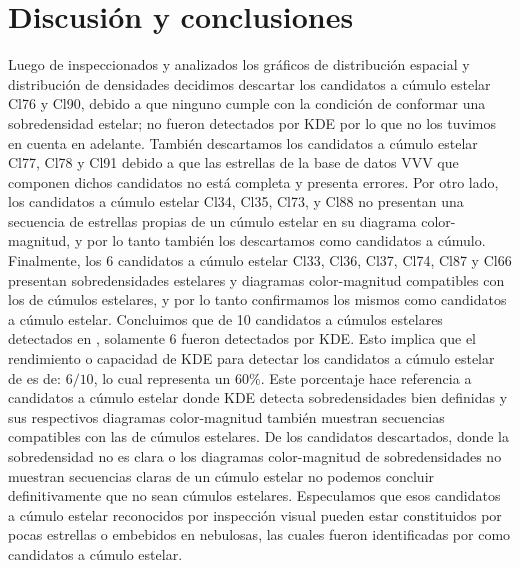\documentclass[baaa]{baaa}
\begin{document}
\section{Discusión y conclusiones}
Luego de inspeccionados y analizados los gráficos de distribución espacial y distribución de densidades decidimos descartar los candidatos a cúmulo estelar Cl76 y Cl90, debido a que ninguno cumple con la condición de conformar una sobredensidad estelar; no fueron detectados por {\sc KDE} por lo que no los tuvimos en cuenta en adelante. También descartamos los candidatos a cúmulo estelar Cl77, Cl78 y Cl91 debido a que las estrellas de la base de datos VVV que componen dichos candidatos no está completa y presenta errores. Por otro lado, los candidatos a cúmulo estelar Cl34, Cl35, Cl73, y Cl88 no presentan una secuencia de estrellas propias de un cúmulo estelar en su diagrama color-magnitud, y por lo tanto también los descartamos como candidatos a cúmulo. Finalmente, los 6 candidatos a cúmulo estelar Cl33, Cl36, Cl37, Cl74, Cl87 y Cl66 presentan sobredensidades estelares y diagramas color-magnitud compatibles con los de cúmulos estelares, y por lo tanto confirmamos los mismos como candidatos a cúmulo estelar. Concluimos que de 10 candidatos a cúmulos estelares detectados en \cite{borissova2011new}, solamente 6 fueron detectados por {\sc KDE}. Esto implica que el rendimiento o capacidad de {\sc KDE} para detectar los candidatos a cúmulo estelar de \cite{borissova2011new} es de: $6/10$,  lo cual representa un $60\%$. Este porcentaje hace referencia a  candidatos a cúmulo estelar donde {\sc KDE} detecta sobredensidades bien definidas y sus respectivos diagramas color-magnitud también muestran secuencias compatibles con las de cúmulos estelares. De los candidatos descartados, donde la sobredensidad no es clara o los diagramas color-magnitud de sobredensidades no muestran secuencias claras de un cúmulo estelar no podemos concluir definitivamente que no sean cúmulos estelares. Especulamos que esos candidatos a cúmulo estelar reconocidos por inspección visual pueden estar constituidos por pocas estrellas o embebidos en nebulosas, las cuales fueron identificadas por \cite{borissova2011new} como candidatos a cúmulo estelar.
\par
\end{document}
